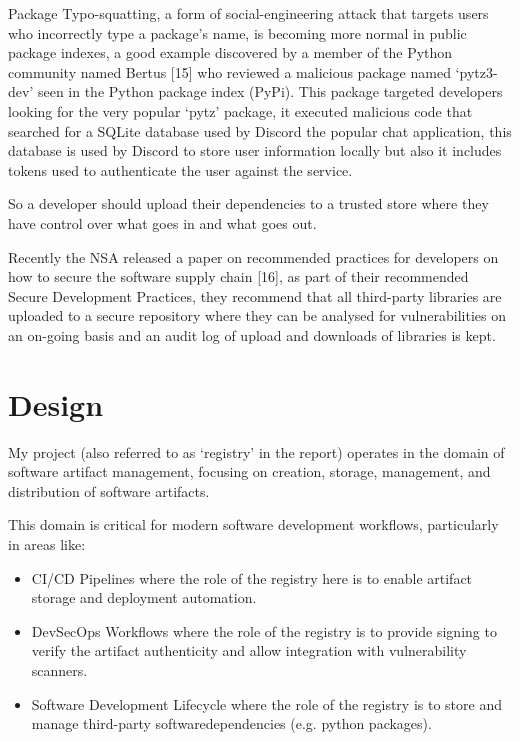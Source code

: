 \documentclass{article}
\begin{document}
  Package Typo-squatting, a form of social-engineering attack that targets users who incorrectly type a package's name, is becoming more normal in public package indexes, a good example discovered by a member of the Python community named Bertus [15] who reviewed a malicious package named `pytz3-dev' seen in the Python package index (PyPi). This package targeted developers looking for the very popular `pytz' package, it executed malicious code that searched for a SQLite database used by Discord the popular chat application, this database is used by Discord to store user information locally but also it includes tokens used to authenticate the user against the service.

  So a developer should upload their dependencies to a trusted store where they have control over what goes in and what goes out.

  Recently the NSA released a paper on recommended practices for developers on how to secure the software supply chain [16], as part of their recommended Secure Development Practices, they recommend that all third-party libraries are uploaded to a secure repository where they can be analysed for vulnerabilities on an on-going basis and an audit log of upload and downloads of libraries is kept.

  \section{Design}

  My project (also referred to as `registry' in the report) operates in the domain of software artifact management, focusing on creation, storage, management, and distribution of software artifacts.
  
  This domain is critical for modern software development workflows, particularly in areas like:

  \begin{itemize}
    \item CI/CD Pipelines where the role of the registry here is to enable artifact storage and deployment automation.
    \item DevSecOps Workflows where the role of the registry is to provide signing to verify the artifact authenticity and allow integration with vulnerability scanners.
    \item Software Development Lifecycle where the role of the registry is to store and manage third-party softwaredependencies (e.g. python packages).
  \end{itemize}
\end{document}
